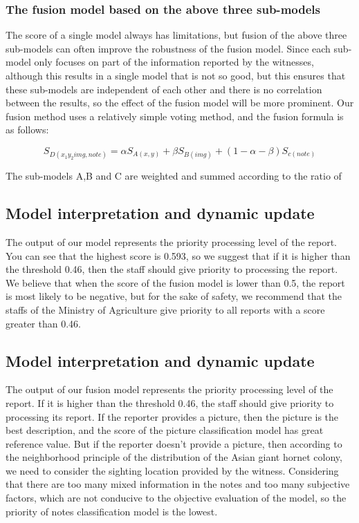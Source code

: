 \documentclass{mcmthesis}
\numberwithin{figure}{section}
\numberwithin{table}{section}
\begin{document}
\subsubsection{The fusion model based on the above three sub-models}

The score of a single model always has limitations, but fusion of the above three sub-models can often improve the robustness of the fusion model. Since each sub-model only focuses on part of the information reported by the witnesses, although this results in a single model that is not so good, but this ensures that these sub-models are independent of each other and there is no correlation between the results, so the effect of the fusion model will be more prominent. Our fusion method uses a relatively simple voting method, and the fusion formula is as follows:

\begin{equation}
  S_{D(x_1 y_2 img,note)} = \alpha S_{A(x,y)}  + \beta S_{B(img)} + (1-\alpha-\beta)S_{c(note)}
\end{equation}

The sub-models A,B and C are weighted and summed according to the ratio of 

\subsection{Model interpretation and dynamic update}

The output of our model represents the priority processing level of the report. You can see that the highest score is 0.593, so we suggest that if it is higher than the threshold 0.46, then the staff should give priority to processing the report. We believe that when the score of the fusion model is lower than 0.5, the report is most likely to be negative, but for the sake of safety, we recommend that the staffs of the Ministry of Agriculture give priority to all reports with a score greater than 0.46.


\subsection{Model interpretation and dynamic update}

The output of our fusion model represents the priority processing level of the report. If it is higher than the threshold 0.46, the staff should give priority to processing its report. If the reporter provides a picture, then the picture is the best description, and the score of the picture classification model has great reference value. But if the reporter doesn't provide a picture, then according to the neighborhood principle of the distribution of the Asian giant hornet colony, we need to consider the sighting location provided by the witness. Considering that there are too many mixed information in the notes and too many subjective factors, which are not conducive to the objective evaluation of the model, so the priority of notes classification model is the lowest.
\end{document}
